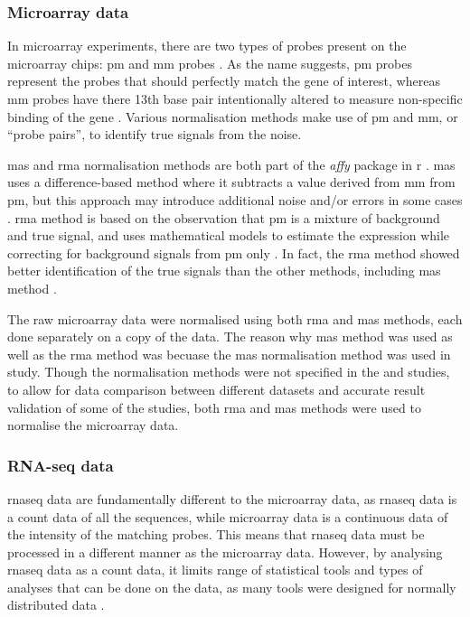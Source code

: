\subsubsection{Microarray data}
\label{ssub:microarray_data}

In microarray experiments, there are two types of probes present on the microarray chips: \gls{pm} and \gls{mm} probes \citep{Irizarry2003}.
As the name suggests, \gls{pm} probes represent the probes that should perfectly match the gene of interest, whereas \gls{mm} probes have there 13th base pair intentionally altered to measure non-specific binding of the gene \citep{Irizarry2003}.
Various normalisation methods make use of \gls{pm} and \gls{mm}, or ``probe pairs'', to identify true signals from the noise.

\Gls{mas} and \gls{rma} normalisation methods are both part of the \textit{affy} package in \gls{r} \citep{Gautier2004}.
\Gls{mas} uses a difference-based method where it subtracts a value derived from \gls{mm} from \gls{pm}, but this approach may introduce additional noise and/or errors in some cases \citep{Irizarry2003}.
\Gls{rma} method is based on the observation that \gls{pm} is a mixture of background and true signal, and uses mathematical models to estimate the expression while correcting for background signals from \gls{pm} only \citep{Irizarry2003}.
In fact, the \gls{rma} method showed better identification of the true signals than the other methods, including \Gls{mas} method \citep{Irizarry2003}.

The raw microarray data were normalised using both \gls{rma} and \gls{mas} methods, each done separately on a copy of the data.
The reason why \gls{mas} method was used as well as the \gls{rma} method was becuase the \gls{mas} normalisation method was used in \citet{Gatza2010a} study.
Though the normalisation methods were not specified in the \citet{Creighton2012} and \citet{Fuentes-Mattei2014} studies, to allow for data comparison between different datasets and accurate result validation of some of the studies, both \gls{rma} and \gls{mas} methods were used to normalise the microarray data.

\subsubsection{RNA-seq data}
\label{ssub:rna_seq_data}

\gls{rnaseq} data are fundamentally different to the microarray data, as \gls{rnaseq} data is a count data of all the sequences, while microarray data is a continuous data of the intensity of the matching probes.
This means that \gls{rnaseq} data must be processed in a different manner as the microarray data.
However, by analysing \gls{rnaseq} data as a count data, it limits range of statistical tools and types of analyses that can be done on the data, as many tools were designed for normally distributed data \citep{Law2014}.

